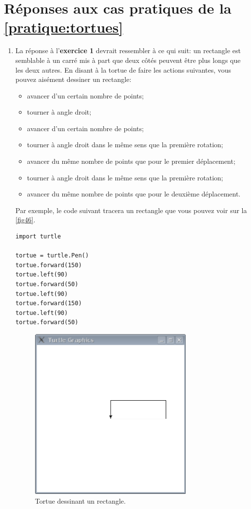 \section{Réponses aux cas pratiques de la \autoref{pratique:tortues}\label{reponses:tortues}}
\begin{enumerate}
\item La réponse à l'\textbf{exercice 1} devrait ressembler à ce qui suit: un rectangle est semblable à un carré mis à part que deux côtés peuvent être plus longs que les deux autres. En disant à la tortue de faire les actions suivantes, vous pouvez aisément dessiner un rectangle:
\begin{itemize}
 \item avancer d'un certain nombre de points;
 \item tourner à angle droit;
 \item avancer d'un certain nombre de points;
 \item tourner à angle droit dans le même sens que la première rotation;
 \item avancer du même nombre de points que pour le premier déplacement;
 \item tourner à angle droit dans le même sens que la première rotation;
 \item avancer du même nombre de points que pour le deuxième déplacement.
\end{itemize}

Par exemple, le code suivant tracera un rectangle que vous pouvez voir sur la \autoref{fig46}.
\begin{Verbatim}[frame=single,rulecolor=\color{mbleu}, label=à taper]
import turtle

tortue = turtle.Pen()
tortue.forward(150)
tortue.left(90)
tortue.forward(50)
tortue.left(90)
tortue.forward(150)
tortue.left(90)
tortue.forward(50)
\end{Verbatim}


\begin{figure}[h!t]
\begin{center}
\includegraphics[width=82mm]{images/rectangletortue.eps}
\end{center}
\caption{Tortue dessinant un rectangle.}\label{fig46}
\end{figure}


\end{enumerate}
